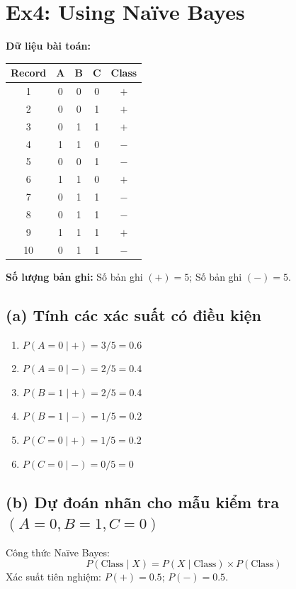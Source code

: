 \section{Ex4: Using Naïve Bayes}

\textbf{Dữ liệu bài toán:}
\begin{table}[H]
    \centering
    \begin{tabular}{|c|c|c|c|c|}
        \hline
        \textbf{Record} & \textbf{A} & \textbf{B} & \textbf{C} & \textbf{Class} \\
        \hline
        1 & 0 & 0 & 0 & $+$ \\ \hline
        2 & 0 & 0 & 1 & $+$ \\ \hline
        3 & 0 & 1 & 1 & $+$ \\ \hline
        4 & 1 & 1 & 0 & $-$ \\ \hline
        5 & 0 & 0 & 1 & $-$ \\ \hline
        6 & 1 & 1 & 0 & $+$ \\ \hline
        7 & 0 & 1 & 1 & $-$ \\ \hline
        8 & 0 & 1 & 1 & $-$ \\ \hline
        9 & 1 & 1 & 1 & $+$ \\ \hline
        10 & 0 & 1 & 1 & $-$ \\ \hline
    \end{tabular}
\end{table}

\textbf{Số lượng bản ghi:} Số bản ghi $(+) = 5$; Số bản ghi $(-) = 5$.

\subsection*{(a) Tính các xác suất có điều kiện}
\begin{enumerate}
    \item $P(A = 0 \mid +) = 3/5 = 0.6$
    \item $P(A = 0 \mid -) = 2/5 = 0.4$
    \item $P(B = 1 \mid +) = 2/5 = 0.4$
    \item $P(B = 1 \mid -) = 1/5 = 0.2$
    \item $P(C = 0 \mid +) = 1/5 = 0.2$
    \item $P(C = 0 \mid -) = 0/5 = 0$
\end{enumerate}

\subsection*{(b) Dự đoán nhãn cho mẫu kiểm tra $(A = 0, B = 1, C = 0)$}
Công thức Naïve Bayes:
$$P(\text{Class} \mid X) = P(X \mid \text{Class}) \times P(\text{Class})$$
Xác suất tiên nghiệm: $P(+) = 0.5$; $P(-) = 0.5$.

